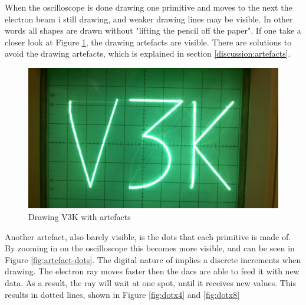 When the oscilloscope is done drawing one primitive and moves to the next the electron beam i still drawing,
and weaker drawing lines may be visible.
In other words all shapes are drawn without "lifting the pencil off the paper".
If one take a closer look at Figure \ref{fig:artefact}, the drawing artefacts are visible.
There are solutions to avoid the drawing artefacts, which is explained in section \ref{discussion:artefacts}.

\begin{figure}[h!]
	    \includegraphics[width=\linewidth]{images/artefacts.jpg}
	    \caption{Drawing V3K with artefacts}
	    \label{fig:artefact}
\end{figure}

Another artefact, also barely visible, is the dots that each primitive is made of.
By zooming in on the oscilloscope this becomes more visible, and can be seen in Figure \ref{fig:artefact-dots}.
The digital nature of \vthreek implies a discrete increments when drawing.
The electron ray moves faster then the \gls{dac}s are able to feed it with new data.
As a result, the ray will wait at one spot, until it receives new values.
This results in dotted lines, shown in Figure \ref{fig:dotx4} and \ref{fig:dotx8}

